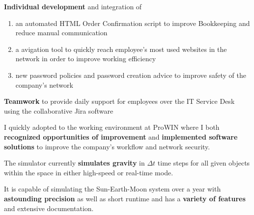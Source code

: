 \documentclass[]{jonas-cv}
\begin{document}
\hfill
\begin{minipage}[t]{0.63\textwidth} 



\sectionsep

\begin{tightemize}
    \item \textbf{Individual development} and integration of
    \begin{enumerate}
        \parskip=0.0em
        \item an automated HTML Order Confirmation script to improve Bookkeeping and reduce manual communication
        \item a avigation tool to quickly reach employee's most used websites in the network in order to improve working efficiency
        \item new password policies and password creation advice to improve safety of the company's network
    \end{enumerate}
    \item \textbf{Teamwork} to provide daily support for employees over the IT Service Desk using the collaborative Jira software
    \vspace{2mm}

    \item [\faicon{angle-double-right}] I quickly adopted to the working environment at ProWIN where I both \textbf{recognized opportunities of improvement} 
    and \textbf{implemented software solutions} to improve the company's workflow and network security.
\end{tightemize}
\largesectionsep




\begin{tightemize}
    \item The simulator currently \textbf{simulates gravity} in $\Delta t$ time steps for all given objects within the space in either high-speed or real-time mode.
    \item It is capable of simulating the Sun-Earth-Moon system over a year with \textbf{astounding precision} as well as short runtime and has a \textbf{variety of features} and extensive documentation.
    \vspace{2mm}


\end{tightemize}
\end{minipage}
\end{document}
